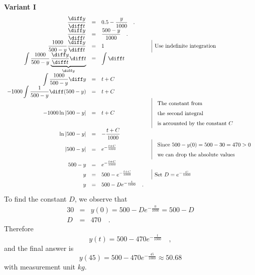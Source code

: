 {\textbf{Variant I} 
\[
{\renewcommand{\arraystretch}{1.5}
\begin{array}{rcll|l}
\displaystyle\frac{\diff y}{\diff t}&=&\displaystyle 0.5-  \frac{y}{1000} \quad .\\
\displaystyle\frac{\diff y}{\diff t}&=&\displaystyle   \frac{500-y}{1000} \quad .\\
\displaystyle \frac{1000}{500- y} \frac{\diff y}{\diff t}&=& \displaystyle 1 &&\text{Use indefinite integration}\\
\displaystyle \int \frac{1000}{500- y} \underbrace{ \frac{\diff y}{\diff t} \diff t}_{\diff y} &=& \displaystyle \int \diff t \\
\displaystyle \int \frac{1000}{500-y}\diff y &=& t+C\\
\displaystyle -1000 \int  \frac{1}{500-y}\diff(500-y)&=& t+C \\
\displaystyle  -1000 \ln |500-y| &=& t+C &&
\begin{array}{l}
\text{The constant from} \\\text{the second integral} \\\text{is accounted by the constant }C
\end{array}
\\
\displaystyle\ln |500-y|&=&\displaystyle -\frac{t+C}{1000} \\
\displaystyle|500-y| &=&\displaystyle e^{-\frac{t+C}{1000}}&& 
\begin{array}{l}
\text{Since }500-y(0)= 500-30=470 >0\\
\text{we can drop the absolute values}
\end{array}\\
\displaystyle 500-y &=&\displaystyle e^{-\frac{t+C}{1000}}\\
\displaystyle y&=& \displaystyle 500-e^{-\frac{t+C}{1000}} &&\text{Set } D= e^{-\frac{C}{1000}}\\
\displaystyle y&=&\displaystyle  500-De^{-\frac{t}{1000}}
\quad .
\end{array}
}
\]
To find the constant $D$, we observe that 
\[
\begin{array}{rcl}
30&=&y(0)= 500 - De^{-\frac{0}{1000}}= 500-D\\
D&=&470\quad .
\end{array}
\]
Therefore 
\[
\displaystyle y(t)= 500- 470 e^{-\frac{t}{1000}}\quad ,
\]
and the final answer is
\[
\displaystyle y(45)=500-470e^{-\frac{45}{1000}}\approx 50.68 
\]
with measurement unit $kg$.

}
